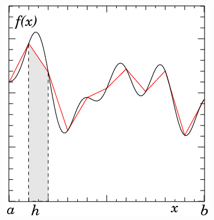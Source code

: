 \documentclass{beamer}
\begin{document}
\begin{frame}
\begin{columns}
\begin{column}{0.5\textwidth}
\begin{overlayarea}{\textwidth}{0.7\textheight}
{\begin{center}
          \end{center}
        }
        {
          \begin{center}
            \includegraphics[width=\textwidth]{figures/trapez2}
          \end{center}
        }
      \end{overlayarea}
    \end{column}
  \end{columns}
\end{frame}
\end{document}
